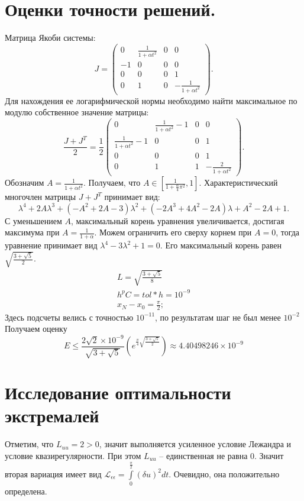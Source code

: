 \documentclass{article}
\begin{document}
\section{Оценки точности решений.}
Матрица Якоби системы:
$$J = \begin{pmatrix}
0 & \frac{1}{1 + \alpha t^{2}} & 0 & 0\\
-1 & 0 & 0 & 0\\
0 & 0 & 0 & 1\\
0 & 1 & 0 & -\frac{1}{1 + \alpha t^{2}}
\end{pmatrix}.$$
Для нахождения ее логарифмической нормы необходимо найти максимальное по модулю собственное значение матрицы:
$$\frac{J + J^{T}}2 = \frac 1 2
\begin{pmatrix}
0 & \frac{1}{1 + \alpha t^{2}}-1 & 0 & 0\\
\frac{1}{1 + \alpha t^{2}}-1 & 0 & 0 & 1\\
0 & 0 & 0 & 1\\
0 & 1 & 1 & -\frac{2}{1 + \alpha t^{2}}
\end{pmatrix}.$$
Обозначим $A = \frac{1}{1 + \alpha t^{2}}$. Получаем, что $A \in [\frac{1}{1 + \frac{\alpha}{4}\pi^{2}}, 1]$.
Характеристический многочлен матрицы $J + J^{T}$ принимает вид:
\[\lambda^{4} + 2A\lambda^{3} + \left(-A^{2} + 2A -3\right)\lambda^{2} + \left(-2A^{3} + 4A^{2} - 2A\right)\lambda + A^{2} - 2A + 1.\]
С уменьшением $A$, максимальный корень уравнения увеличивается, достигая максимума при $A = \frac{1}{1 + \alpha}$.
Можем ограничить его сверху корнем при $A = 0$, тогда уравнение принимает вид $\lambda^{4} - 3\lambda^{2} + 1 = 0$.
Его максимальный корень равен $\sqrt{\frac{3 + \sqrt{5}}{2}}$.
\begin{gather*}
  L = \sqrt{\frac{3 + \sqrt{5}}{8}}\\
  h^{p}C = tol*h = 10^{-9}\\
  x_{N} - x_{0} = \frac \pi 2;
\end{gather*}
Здесь подсчеты велись с точностью $10^{-11}$, по результатам шаг не был менее $10^{-2}$
Получаем оценку $$E \le \frac{2\sqrt{2}\times 10^{-9}}{\sqrt{3 + \sqrt{5}}}(e^{\frac \pi 4\sqrt{\frac{3 + \sqrt{5}}{2}}}) \approx 4.40498246\times 10^{-9}$$
\section{Исследование оптимальности экстремалей}
Отметим, что $L_{uu} = 2 > 0$, значит выполняется усиленное условие Лежандра и условие
квазирегулярности. При этом $L_{uu}$ -- единственная не равна $0$.
Значит вторая вариация имеет вид
$\mathcal{L}_{\epsilon\epsilon} = \int\limits_{0}^{\frac \pi 2}(\delta u)^{2}dt$. Очевидно, она положительно определена.
\end{document}
